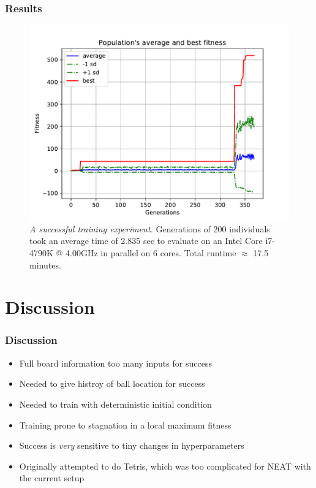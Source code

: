 \documentclass[t,pdflatex]{beamer}
\begin{document}
    \begin{frame}

        \frametitle{Results}
         \begin{figure}[h!]
            \centering
            \includegraphics[width=.7 \textwidth]{avg_fitness.pdf}
            \caption{\textit{A successful training experiment.} 
                Generations of 200 individuals took an average time of 2.835 sec to evaluate on an
                Intel Core i7-4790K @ 4.00GHz in parallel on 6 cores. Total runtime $\approx$ 17.5 minutes.}
        \end{figure}

    \end{frame}

\section{Discussion}

        \begin{frame}

        \frametitle{Discussion}
         \begin{itemize}
             \item Full board information too many inputs for success
             \item Needed to give histroy of ball location for success
             \item Needed to train with deterministic initial condition
             \item Training prone to stagnation in a local maximum fitness
             \item Success is \emph{very} sensitive to tiny changes in hyperparameters 
             \item Originally attempted to do Tetris, which was too complicated for NEAT with the current setup
         \end{itemize}

    \end{frame}
\end{document}
